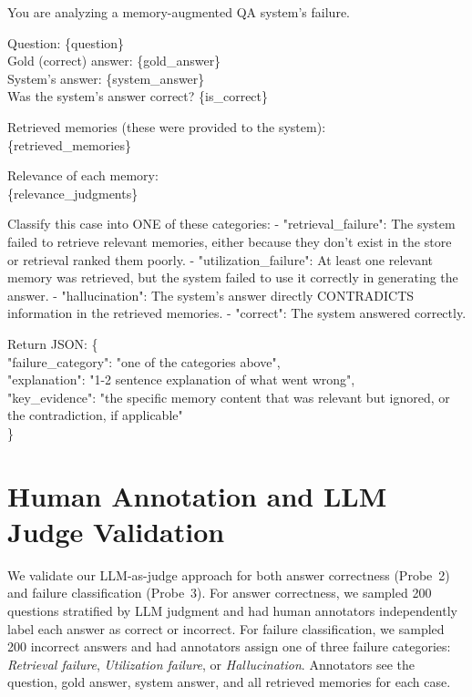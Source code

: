 \documentclass{article} %
\begin{document}
\begin{tcolorbox}[
  colback=gray!5!white,
  colframe=gray!75!black,
  title=Failure Classification Prompt,
  breakable
]
\small\ttfamily\raggedright
You are analyzing a memory-augmented QA system's failure.

Question: \{question\}\\
Gold (correct) answer: \{gold\_answer\}\\
System's answer: \{system\_answer\}\\
Was the system's answer correct? \{is\_correct\}

Retrieved memories (these were provided to the system):\\
\{retrieved\_memories\}

Relevance of each memory:\\
\{relevance\_judgments\}

Classify this case into ONE of these categories:
- "retrieval\_failure": The system failed to retrieve relevant memories, either because they don't exist in the store or retrieval ranked them poorly.
- "utilization\_failure": At least one relevant memory was retrieved, but the system failed to use it correctly in generating the answer.
- "hallucination": The system's answer directly CONTRADICTS information in the retrieved memories.
- "correct": The system answered correctly.

Return JSON:
\{\\
\hspace{1em}"failure\_category": "one of the categories above",\\
\hspace{1em}"explanation": "1-2 sentence explanation of what went wrong",\\
\hspace{1em}"key\_evidence": "the specific memory content that was relevant but ignored, or the contradiction, if applicable"\\
\}
\end{tcolorbox}


\section{Human Annotation and LLM Judge Validation}
\label{app:annotation}

We validate our LLM-as-judge approach for both answer correctness (Probe~2) and failure classification (Probe~3). For answer correctness, we sampled 200 questions stratified by LLM judgment and had human annotators independently label each answer as correct or incorrect. For failure classification, we sampled 200 incorrect answers and had annotators assign one of three failure categories: \textit{Retrieval failure}, \textit{Utilization failure}, or \textit{Hallucination}. Annotators see the question, gold answer, system answer, and all retrieved memories for each case.
\end{document}
